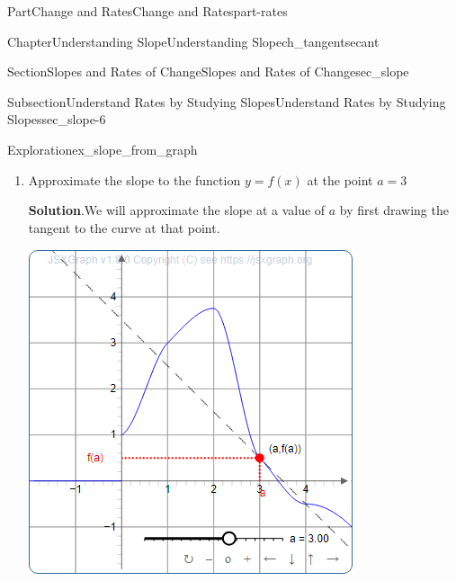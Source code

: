 \documentclass{tufte-book}
\newcommand{\blocktitlefont}{\relax}
\numberwithin{equation}{chapter}
\begin{document}
\begin{partptx}{Part}{Change and Rates}{}{Change and Rates}{}{}{part-rates}
\begin{chapterptx}{Chapter}{Understanding Slope}{}{Understanding Slope}{}{}{ch_tangentsecant}
\begin{sectionptx}{Section}{Slopes and Rates of Change}{}{Slopes and Rates of Change}{}{}{sec_slope}
\begin{subsectionptx}{Subsection}{Understand Rates by Studying Slopes}{}{Understand Rates by Studying Slopes}{}{}{sec_slope-6}
\begin{exploration}{Exploration}{}{ex_slope_from_graph}
\begin{enumerate}[font=\bfseries,label=(\alph*),ref=\alph*]
\begin{equation*}
m = \dfrac{3.75-3.75}{2-0} = \dfrac{0}{2} = 0
\end{equation*}
Therefore, the slope of \(f(x)\) at \(a=2\) is equal to 0.%
\item{}Approximate the slope to the function \(y=f(x)\) at the point \(a=3\)%
\par\smallskip%
\noindent\textbf{\blocktitlefont Solution}.\hypertarget{ex_slope_from_graph-4-2}{}\quad{}We will approximate the slope at a value of \(a\) by first drawing the tangent to the curve at that point.%
\begin{sidebyside}{2}{0.075}{0.075}{0.17}%
\begin{sbspanel}{0.47}%
\includegraphics[width=\linewidth]{generated/preview/ex_slope_from_graph-4-2-2-preview.png}
\end{sbspanel}%
\begin{sbspanel}{0.21}%

\end{sbspanel}
\end{sidebyside}
\end{enumerate}
\end{exploration}
\end{subsectionptx}
\end{sectionptx}
\end{chapterptx}
\end{partptx}
\end{document}
